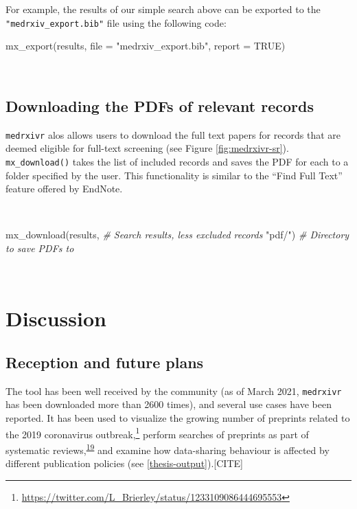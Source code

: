 \documentclass[a4paper, twoside]{templates/ociamthesis}
\newenvironment{Shaded}{\begin{snugshade}}{\end{snugshade}}
\newcommand{\AttributeTok}[1]{\textcolor[rgb]{0.77,0.63,0.00}{#1}}
\newcommand{\CommentTok}[1]{\textcolor[rgb]{0.56,0.35,0.01}{\textit{#1}}}
\newcommand{\ConstantTok}[1]{\textcolor[rgb]{0.00,0.00,0.00}{#1}}
\newcommand{\FunctionTok}[1]{\textcolor[rgb]{0.00,0.00,0.00}{#1}}
\newcommand{\NormalTok}[1]{#1}
\newcommand{\StringTok}[1]{\textcolor[rgb]{0.31,0.60,0.02}{#1}}
\renewenvironment{Shaded}
{
  \vspace{4pt}%
  \begin{snugshade}%
}{%
  \end{snugshade}%
  \vspace{4pt}%
}
\begin{document}
For example, the results of our simple search above can be exported to the \texttt{"medrxiv\_export.bib"} file using the following code:

\begin{Shaded}
\begin{Highlighting}[]
\FunctionTok{mx\_export}\NormalTok{(results, }
          \AttributeTok{file =} \StringTok{"medrxiv\_export.bib"}\NormalTok{,}
          \AttributeTok{report =} \ConstantTok{TRUE}\NormalTok{)}
\end{Highlighting}
\end{Shaded}

~

\hypertarget{downloading-the-pdfs-of-relevant-records}{%
\subsection{Downloading the PDFs of relevant records}\label{downloading-the-pdfs-of-relevant-records}}

\texttt{medrxivr} alos allows users to download the full text papers for records that are deemed eligible for full-text screening (see Figure \ref{fig:medrxivr-sr}). \texttt{mx\_download()} takes the list of included records and saves the PDF for each to a folder specified by the user. This functionality is similar to the ``Find Full Text'' feature offered by EndNote.

~

\begin{Shaded}
\begin{Highlighting}[]
\FunctionTok{mx\_download}\NormalTok{(results,  }\CommentTok{\# Search results, less excluded records}
            \StringTok{"pdf/"}\NormalTok{)   }\CommentTok{\# Directory to save PDFs to }
\end{Highlighting}
\end{Shaded}

~

\hypertarget{discussion}{%
\section{Discussion}\label{discussion}}

\hypertarget{reception-and-future-plans}{%
\subsection{Reception and future plans}\label{reception-and-future-plans}}

The tool has been well received by the community (as of March 2021, \texttt{medrxivr} has been downloaded more than 2600 times), and several use cases have been reported. It has been used to visualize the growing number of preprints related to the 2019 coronavirus outbreak,\footnote{\url{https://twitter.com/L_Brierley/status/1233109086444695553}} perform searches of preprints as part of systematic reviews,\textsuperscript{\protect\hyperlink{ref-noone2020}{19}} and examine how data-sharing behaviour is affected by different publication policies (see \ref{thesis-output}).{[}CITE{]}
\end{document}
